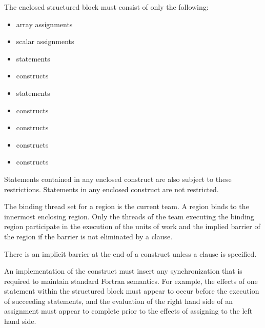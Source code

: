 The enclosed structured block must consist of only the following:

\begin{itemize}
\item array assignments 

\item scalar assignments 

\item {} statements

\item {} constructs 

\item {} statements

\item {} constructs

\item {} constructs

\item {} constructs

\item {} constructs
\end{itemize}

Statements contained in any enclosed  construct are also subject to these 
restrictions. Statements in any enclosed  construct are not restricted.

\binding
The binding thread set for a  region is the current team. A  
region binds to the innermost enclosing  region. Only the threads of the team 
executing the binding  region participate in the execution of the units of 
work and the implied barrier of the  region if the barrier is not eliminated 
by a  clause.
\begin{figure}[t!]
\end{figure}

\descr
There is an implicit barrier at the end of a  construct unless a  
clause is specified.

An implementation of the  construct must insert any synchronization that is 
required to maintain standard Fortran semantics. For example, the effects of one 
statement within the structured block must appear to occur before the execution of 
succeeding statements, and the evaluation of the right hand side of an assignment must 
appear to complete prior to the effects of assigning to the left hand side.

